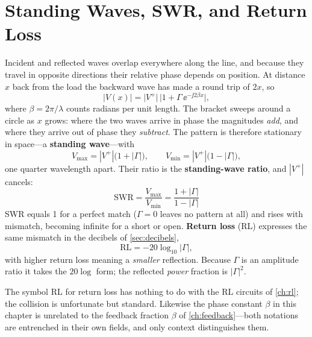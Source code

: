 \section{Standing Waves, SWR, and Return Loss}
Incident and reflected waves overlap everywhere along the line, and because they
travel in opposite directions their relative phase depends on position. At distance
\(x\) back from the load the backward wave has made a round trip of \(2x\), so
\[
|V(x)|=\bigl|V^{+}\bigr|\,\bigl|1+\Gamma\,\ee^{-\jj 2\beta x}\bigr| ,
\]
where \(\beta=2\pi/\lambda\) counts radians per unit length. The bracket sweeps
around a circle as \(x\) grows: where the two waves arrive in phase the magnitudes
\emph{add}, and where they arrive out of phase they \emph{subtract}. The pattern is
therefore stationary in space---a \textbf{standing wave}---with
\[
V_{\max}=|V^{+}|\bigl(1+|\Gamma|\bigr),
\qquad
V_{\min}=|V^{+}|\bigl(1-|\Gamma|\bigr),
\]
one quarter wavelength apart. Their ratio is the \textbf{standing-wave ratio},
and \(|V^{+}|\) cancels:
\[
\boxed{\;\mathrm{SWR}=\frac{V_{\max}}{V_{\min}}
=\frac{1+|\Gamma|}{1-|\Gamma|}\;}
\]
SWR equals 1 for a perfect match (\(\Gamma=0\) leaves no pattern at all) and rises
with mismatch, becoming infinite for a short or open. \textbf{Return loss} (RL)
expresses the same mismatch in the decibels of \cref{sec:decibels},
\[
\mathrm{RL}=-20\log_{10}|\Gamma| ,
\]
with higher return loss meaning a \emph{smaller} reflection. Because \(\Gamma\) is
an amplitude ratio it takes the \(20\log\) form; the reflected \emph{power}
fraction is \(|\Gamma|^2\).

\begin{mistakebox}
The symbol \(\mathrm{RL}\) for return loss has nothing to do with the RL circuits of
\cref{ch:rl}; the collision is unfortunate but standard. Likewise the phase constant
\(\beta\) in this chapter is unrelated to the feedback fraction \(\beta\) of
\cref{ch:feedback}---both notations are entrenched in their own fields, and only
context distinguishes them.
\end{mistakebox}

